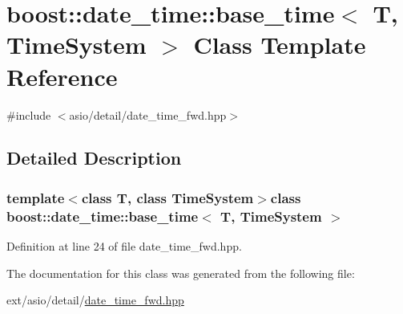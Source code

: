 \hypertarget{classboost_1_1date__time_1_1base__time}{}\section{boost\+:\+:date\+\_\+time\+:\+:base\+\_\+time$<$ T, Time\+System $>$ Class Template Reference}
\label{classboost_1_1date__time_1_1base__time}


{\ttfamily \#include $<$asio/detail/date\+\_\+time\+\_\+fwd.\+hpp$>$}



\subsection{Detailed Description}
\subsubsection*{template$<$class T, class Time\+System$>$class boost\+::date\+\_\+time\+::base\+\_\+time$<$ T, Time\+System $>$}



Definition at line 24 of file date\+\_\+time\+\_\+fwd.\+hpp.



The documentation for this class was generated from the following file\+:\begin{DoxyCompactItemize}
\item 
ext/asio/detail/\hyperlink{date__time__fwd_8hpp}{date\+\_\+time\+\_\+fwd.\+hpp}\end{DoxyCompactItemize}

